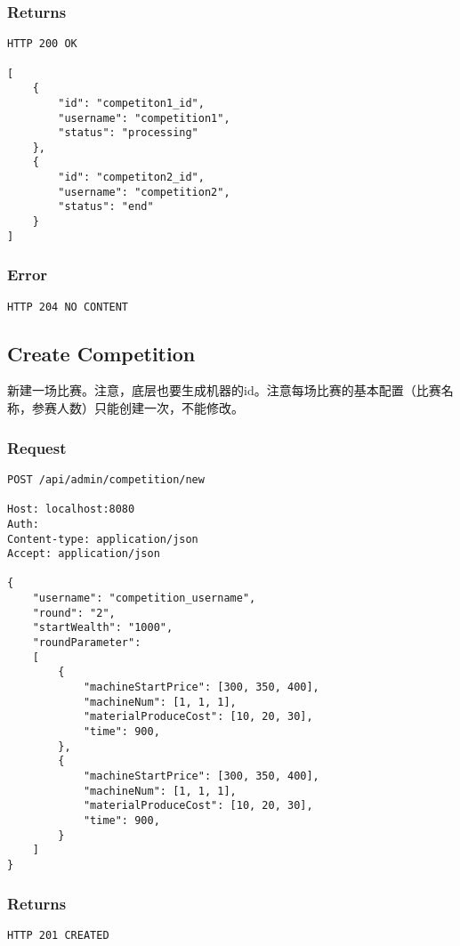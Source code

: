 \documentclass{article}
\begin{document}
\subsubsection*{Returns}
\begin{lstlisting}
HTTP 200 OK

[
	{
	    "id": "competiton1_id",
	    "username": "competition1",
	    "status": "processing"
	},
	{
	    "id": "competiton2_id",
	    "username": "competition2",
	    "status": "end"
	}
]
\end{lstlisting}

\subsubsection*{Error}
\begin{lstlisting}
HTTP 204 NO CONTENT
\end{lstlisting}

\subsection{Create Competition}
新建一场比赛。注意，底层也要生成机器的id。注意每场比赛的基本配置（比赛名称，参赛人数）只能创建一次，不能修改。

\subsubsection*{Request}
\begin{lstlisting}
POST /api/admin/competition/new

Host: localhost:8080
Auth:
Content-type: application/json
Accept: application/json

{
    "username": "competition_username",
    "round": "2",
    "startWealth": "1000",
    "roundParameter":
    [
        {
            "machineStartPrice": [300, 350, 400],
            "machineNum": [1, 1, 1],
            "materialProduceCost": [10, 20, 30],
            "time": 900,
        },
        {
            "machineStartPrice": [300, 350, 400],
            "machineNum": [1, 1, 1],
            "materialProduceCost": [10, 20, 30],
            "time": 900,
        }
    ]
}
\end{lstlisting}

\subsubsection*{Returns}
\begin{lstlisting}
HTTP 201 CREATED

\end{lstlisting}
\end{document}
